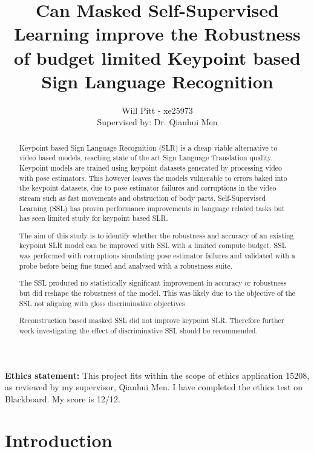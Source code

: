 \documentclass{article}
\title{Can Masked Self-Supervised Learning improve the Robustness of budget limited Keypoint based Sign Language Recognition}
\author{Will Pitt - xe25973 \\ 
        Supervised by: Dr. Qianhui Men}
\begin{document}
\maketitle

\begin{abstract}
Keypoint based Sign Language Recognition (SLR) is a cheap viable alternative to video based models, reaching state of the art Sign Language Translation quality. Keypoint models are trained using keypoint datasets generated by processing video with pose estimators. This however leaves the models vulnerable to errors baked into the keypoint datasets, due to pose estimator failures and corruptions in the video stream such as fast movements and obstruction of body parts. Self-Supervised Learning (SSL) has proven performance improvements in language related tasks but has seen limited study for keypoint based SLR. 

The aim of this study is to identify whether the robustness and accuracy of an existing keypoint SLR model can be improved with SSL with a limited compute budget. SSL was performed with corruptions simulating pose estimator failures and validated with a probe before being fine tuned and analysed with a robustness suite. 

The SSL produced no statistically significant improvement in accuracy or robustness but did reshape the robustness of the model. This was likely due to the objective of the SSL not aligning with gloss discriminative objectives. 

Reconstruction based masked SSL did not improve keypoint SLR. Therefore further work investigating the effect of discriminative SSL should be recommended.

\vspace{35mm} 
\end{abstract}

\textbf{Ethics statement: } 
This project fits within the scope of ethics application 15208, as reviewed by my supervisor, Qianhui Men. I have completed the ethics test on Blackboard. My score is 12/12.

\newpage %
\tableofcontents

\newpage

\section{Introduction}
\end{document}
